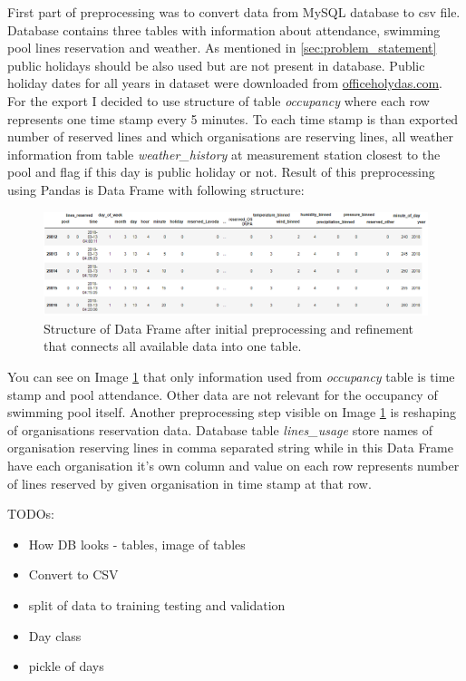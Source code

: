 \documentclass{article}
\begin{document}
First part of preprocessing was to convert data from MySQL database to csv file. Database contains three tables with information about attendance, swimming pool lines reservation and weather. As mentioned in \ref{sec:problem_statement} public holidays should be also used but are not present in database. Public holiday dates for all years in dataset were downloaded from \href{https://www.officeholidays.com/countries/czech-republic}{officeholydas.com}. For the export I decided to use structure of table \emph{occupancy} where each row represents one time stamp every 5 minutes. To each time stamp is than exported number of reserved lines and which organisations are reserving lines, all weather information from table \emph{weather\_history} at measurement station closest to the pool and flag if this day is public holiday or not. Result of this preprocessing using Pandas is Data Frame with following structure:

\begin{figure}[h!]
\centering
\includegraphics[width=12cm]{imgs/dataframe_head}
\caption{Structure of Data Frame after initial preprocessing and refinement that connects all available data into one table.}
\label{fig:dataframe_structure}
\end{figure}

You can see on Image \ref{fig:dataframe_structure} that only information used from \emph{occupancy} table is time stamp and pool attendance. Other data are not relevant for the occupancy of swimming pool itself. Another preprocessing step visible on Image \ref{fig:dataframe_structure} is reshaping of organisations reservation data. Database table \emph{lines\_usage} store names of organisation reserving lines in comma separated string while in this Data Frame have each organisation it's own column and value on each row represents number of lines reserved by given organisation in time stamp at that row. 


 
\color{red}
TODOs:
\begin{itemize}
    \item How DB looks - tables, image of tables
    \item Convert to CSV
    \item split of data to training testing and validation
    \item Day class 
    \item pickle of days
\end{itemize}
\color{black}
\end{document}
